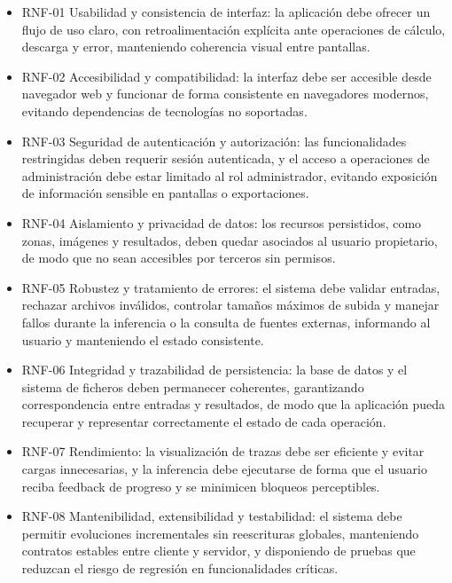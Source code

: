 \begin{itemize}
	\item RNF-01 Usabilidad y consistencia de interfaz: la aplicación debe ofrecer un flujo de uso claro, con retroalimentación explícita ante operaciones de cálculo, descarga y error, manteniendo coherencia visual entre pantallas.
	
	\item RNF-02 Accesibilidad y compatibilidad: la interfaz debe ser accesible desde navegador web y funcionar de forma consistente en navegadores modernos, evitando dependencias de tecnologías no soportadas.
	
	\item RNF-03 Seguridad de autenticación y autorización: las funcionalidades restringidas deben requerir sesión autenticada, y el acceso a operaciones de administración debe estar limitado al rol administrador, evitando exposición de información sensible en pantallas o exportaciones.
	
	\item RNF-04 Aislamiento y privacidad de datos: los recursos persistidos, como zonas, imágenes y resultados, deben quedar asociados al usuario propietario, de modo que no sean accesibles por terceros sin permisos.
	
	\item RNF-05 Robustez y tratamiento de errores: el sistema debe validar entradas, rechazar archivos inválidos, controlar tamaños máximos de subida y manejar fallos durante la inferencia o la consulta de fuentes externas, informando al usuario y manteniendo el estado consistente.
	
	\item RNF-06 Integridad y trazabilidad de persistencia: la base de datos y el sistema de ficheros deben permanecer coherentes, garantizando correspondencia entre entradas y resultados, de modo que la aplicación pueda recuperar y representar correctamente el estado de cada operación.
	
	\item RNF-07 Rendimiento: la visualización de trazas debe ser eficiente y evitar cargas innecesarias, y la inferencia debe ejecutarse de forma que el usuario reciba feedback de progreso y se minimicen bloqueos perceptibles.
	
	\item RNF-08 Mantenibilidad, extensibilidad y testabilidad: el sistema debe permitir evoluciones incrementales sin reescrituras globales, manteniendo contratos estables entre cliente y servidor, y disponiendo de pruebas que reduzcan el riesgo de regresión en funcionalidades críticas.
	

\end{itemize}
